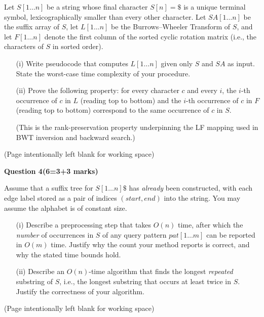\documentclass[12pt,letterpaper]{article}
\newcommand{\marksbox}[1]{%
  \vfill
  \begin{flushright}
    \fbox{\parbox[c][1.1cm][c]{1.3cm}{\centering #1}}
  \end{flushright}
}
\newcommand{\questiontitle}[2]{%
  \textbf{Question #1}\hfill\textbf{(#2 marks)}
}
\newcommand{\workingpage}{%
  \newpage
  \begin{center}
    (Page intentionally left blank for working space)
  \end{center}
}
\begin{document}
Let $S[1 \ldots n]$ be a string whose final character $S[n] = \$$ is a unique
terminal symbol, lexicographically smaller than every other character. Let
$SA[1 \ldots n]$ be the suffix array of $S$, let $L[1 \ldots n]$ be the
Burrows--Wheeler Transform of $S$, and let $F[1 \ldots n]$ denote the first
column of the sorted cyclic rotation matrix (i.e., the characters of $S$ in
sorted order).

\begin{enumerate}
  \item[(i)] Write pseudocode that computes $L[1 \ldots n]$ given only $S$ and
  $SA$ as input. State the worst-case time complexity of your procedure.

  \item[(ii)] Prove the following property: for every character $c$ and every
  $i$, the $i$-th occurrence of $c$ in $L$ (reading top to bottom) and the
  $i$-th occurrence of $c$ in $F$ (reading top to bottom) correspond to the
  same occurrence of $c$ in $S$.

  (This is the rank-preservation property underpinning the LF mapping used in
  BWT inversion and backward search.)
\end{enumerate}

\marksbox{6}

\workingpage
\newpage

\questiontitle{4}{6=3+3}

Assume that a suffix tree for $S[1 \ldots n]\$$ has \emph{already} been
constructed, with each edge label stored as a pair of indices
$(start, end)$ into the string. You may assume the alphabet is of constant
size.

\begin{enumerate}
  \item[(i)] Describe a preprocessing step that takes $O(n)$ time, after
  which the \emph{number} of occurrences in $S$ of any query pattern
  $pat[1 \ldots m]$ can be reported in $O(m)$ time. Justify why the count
  your method reports is correct, and why the stated time bounds hold.

  \item[(ii)] Describe an $O(n)$-time algorithm that finds the longest
  \emph{repeated} substring of $S$, i.e., the longest substring that occurs
  at least twice in $S$. Justify the correctness of your algorithm.
\end{enumerate}

\marksbox{6}

\workingpage
\newpage
\end{document}
